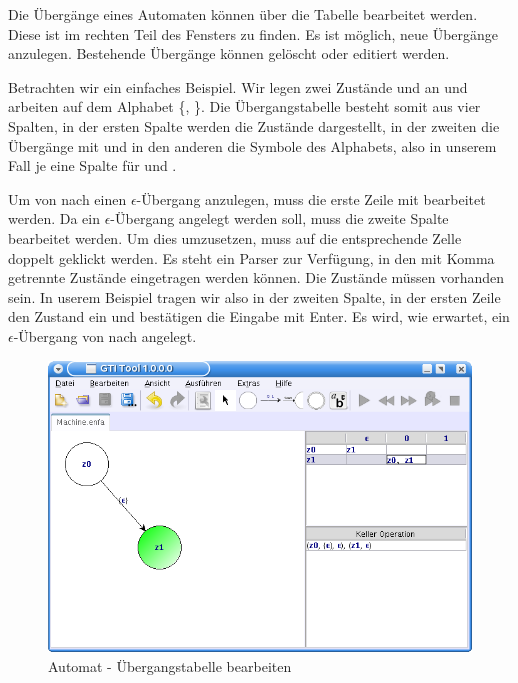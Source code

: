 Die Übergänge eines Automaten können über die Tabelle bearbeitet werden. Diese
ist im rechten Teil des Fensters zu finden. Es ist möglich, neue Übergänge
anzulegen. Bestehende Übergänge können gelöscht oder editiert werden.\vspace{10pt}

Betrachten wir ein einfaches Beispiel. Wir legen zwei Zustände  und
 an und arbeiten auf dem Alphabet \{, \}. Die
Übergangstabelle besteht somit aus vier Spalten, in der ersten Spalte werden die
Zustände dargestellt, in der zweiten die Übergänge mit \Symbol{$\epsilon$} und in
den anderen die Symbole des Alphabets, also in unserem Fall je eine Spalte für
 und .\vspace{10pt}

Um von  nach  einen $\epsilon$-Übergang anzulegen, muss die
erste Zeile mit  bearbeitet werden. Da ein $\epsilon$-Übergang angelegt
werden soll, muss die zweite Spalte bearbeitet werden. Um dies umzusetzen, muss
auf die entsprechende Zelle doppelt geklickt werden. Es steht ein Parser zur
Verfügung, in den mit Komma getrennte Zustände eingetragen werden können. Die
Zustände müssen vorhanden sein. In userem Beispiel tragen wir also in der zweiten
Spalte, in der ersten Zeile den Zustand  ein und bestätigen die Eingabe
mit Enter. Es wird, wie erwartet, ein $\epsilon$-Übergang von  nach
 angelegt.\vspace{10pt}

\begin{figure}[h]
\begin{center}
\includegraphics[width=12cm]{../images/machine_table.png}
\caption{Automat - Übergangstabelle bearbeiten}
\end{center}
\end{figure}

